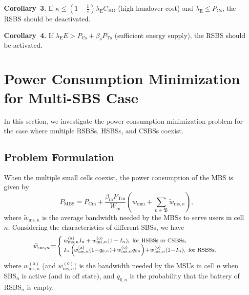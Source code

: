 \documentclass[12pt, draftclsnofoot,onecolumn]{IEEEtran}
\begin{document}
\textbf{Corollary~3.} If $\kappa \leq (1-\frac{1}{e}) \lambda_\mathrm{E} C_\mathrm{HO}$ (high handover cost) and $\lambda_\mathrm{E} \leq P_{\mathrm{Cs}}$, the RSBS should be deactivated.

\textbf{Corollary~4.} If $\lambda_\mathrm{E} E > P_{\mathrm{Cs}}+\beta_{s}P_\mathrm{Ts}$ (sufficient energy supply), the RSBS should be activated. \section{Power Consumption Minimization for Multi-SBS Case}
    \label{sec_Multiple_SBS}
    In this section, we investigate the power consumption minimization problem for the case where multiple RSBSs, HSBSs, and CSBSs coexist.

\subsection{Problem Formulation}

When the multiple small cells coexist, the power consumption of the MBS is given by
\begin{equation}\label{eq_P_mbs_multi_sbs}
    P_\mathrm{MBS} = P_{\mathrm{Cm}} + \frac{\beta_\mathrm{m}P_\mathrm{Tm}}{W_\mathrm{m}} \left(w_\mathrm{mm} + \sum\limits_{n\in\mathfrak{B}} \tilde{w}_{\mathrm{ms},n}\right),
\end{equation}
where $\tilde{w}_{\mathrm{ms},n}$ is the average bandwidth needed by the MBSs to serve users in cell $n$.
Considering the characteristics of different SBSs, we have
\begin{equation}\label{eq_w_ms} \footnotesize
    \tilde{w}_{\mathrm{ms},n} \!=\! \left\{\! \begin{array}{l} \!w_{\mathrm{ms},n}^{(\mathrm{a})} I_{n} + w_{\mathrm{ms},n}^{(\mathrm{o})} (1- I_{n}),~\mbox{for HSBSs or CSBSs,} \\ \! I_n \left(\! w_{\mathrm{ms},n}^{(\mathrm{a})} (1\!-\!q_{0,n}) \!+\! w_{\mathrm{ms},n}^{(\mathrm{o})} q_{0n}\right) \!+\! w_{\mathrm{ms},n}^{(\mathrm{o})} (1\!-\! I_{n}),~\mbox{for RSBSs}, \end{array} \right.
\end{equation}
where $w_{\mathrm{ms},n}^{(\mathrm{a})}$ (and $w_{\mathrm{ms},n}^{(\mathrm{o})}$) is the bandwidth needed by the MSUs in cell $n$ when SBS$_n$ is active (and in off state), and $q_{0,n}$ is the probability that the battery of RSBS$_n$ is empty.
\end{document}
